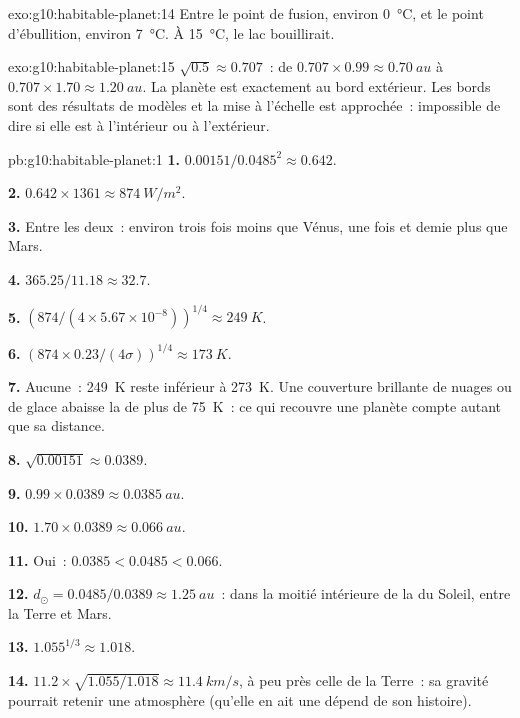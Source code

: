 \begin{solution}{exo:g10:habitable-planet:14}
Entre le point de fusion, environ \qty{0}{\degreeCelsius}, et le point
d'ébullition, environ \qty{7}{\degreeCelsius}. À \qty{15}{\degreeCelsius},
le lac bouillirait.
\end{solution}

\begin{solution}{exo:g10:habitable-planet:15}
$\sqrt{0.5} \approx 0.707$~: de $0.707 \times 0.99 \approx \qty{0.70}{au}$
à $0.707 \times 1.70 \approx \qty{1.20}{au}$. La planète est exactement au
bord extérieur. Les bords sont des résultats de modèles et la mise à
l'échelle est approchée~: impossible de dire si elle est à l'intérieur ou à
l'extérieur.
\end{solution}

\begin{solution}{pb:g10:habitable-planet:1}
\textbf{1.} $0.00151/0.0485^2 \approx 0.642$.

\textbf{2.} $0.642 \times 1361 \approx \qty{874}{W/m^2}$.

\textbf{3.} Entre les deux~: environ trois fois moins que Vénus, une fois et
demie plus que Mars.

\textbf{4.} $365.25/11.18 \approx 32.7$.

\textbf{5.} $(874/(4 \times 5.67\times10^{-8}))^{1/4} \approx \qty{249}{K}$.

\textbf{6.} $(874 \times 0.23/(4\sigma))^{1/4} \approx \qty{173}{K}$.

\textbf{7.} Aucune~: \qty{249}{K} reste inférieur à \qty{273}{K}. Une
couverture brillante de nuages ou de glace abaisse la  de plus de \qty{75}{K}~: ce qui recouvre une planète compte
autant que sa distance.

\textbf{8.} $\sqrt{0.00151} \approx 0.0389$.

\textbf{9.} $0.99 \times 0.0389 \approx \qty{0.0385}{au}$.

\textbf{10.} $1.70 \times 0.0389 \approx \qty{0.066}{au}$.

\textbf{11.} Oui~: $0.0385 < 0.0485 < 0.066$.

\textbf{12.} $d_\odot = 0.0485/0.0389 \approx \qty{1.25}{au}$~: dans la
moitié intérieure de la  du Soleil, entre la Terre et Mars.

\textbf{13.} $1.055^{1/3} \approx 1.018$.

\textbf{14.} $11.2 \times \sqrt{1.055/1.018} \approx \qty{11.4}{km/s}$, à
peu près celle de la Terre~: sa gravité pourrait retenir une atmosphère
(qu'elle en ait une dépend de son histoire).


\end{solution}
